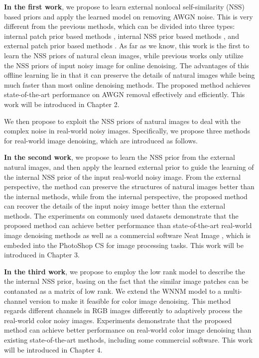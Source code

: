 \textbf{In the first work}, we propose to learn external nonlocal self-similarity (NSS) based priors and apply the learned model on removing AWGN noise. This is very different from the previous methods, which can be divided into three types: internal patch prior based methods \cite{ksvd,ple}, internal NSS prior based methods \cite{bm3d,lssc,ncsr,wnnm}, and external patch prior based methods \cite{epll}. As far as we know, this work is the first to learn the NSS priors of natural clean images, while previous works only utilize the NSS priors of input noisy image for online denoising. The advantages of this offline learning lie in that it can preserve the details of natural images while being much faster than most online denoising methods. The proposed method achieves state-of-the-art performance on AWGN removal effectively and efficiently. This work will be introduced in Chapter 2.

We then propose to exploit the NSS priors of natural images to deal with the complex noise in real-world noisy images. Specifically, we propose three methods for real-world image denoising, which are introduced as follows.

\textbf{In the second work}, we propose to learn the NSS prior from the external natural images, and then apply the learned external prior to guide the learning of the internal NSS prior of the input real-world noisy image. From the external perspective, the method can preserve the structures of natural images better than the internal methods, while from the internal perspective, the proposed method can recover the details of the input noisy image better than the external methods. The experiments on commonly used datasets demonstrate that the proposed method can achieve better performance than state-of-the-art real-world image denoising methods as well as a commercial software Neat Image \cite{neatimage}, which is embeded into the PhotoShop CS for image processing tasks. This work will be introduced in Chapter 3.


\textbf{In the third work}, we propose to employ the low rank model to describe the the internal NSS prior, basing on the fact that the similar image patches can be contanated as a matrix of low rank. We extend the WNNM model \cite{wnnm} to a multi-channel version to make it feasible for color image denoising. This method regards different channels in RGB images differently to adaptively process the real-world color noisy images. Experiments demonstrate that the proposed method can achieve better performance on real-world color image denoising than existing state-of-the-art methods, including some commercial software. This work will be introduced in Chapter 4.


